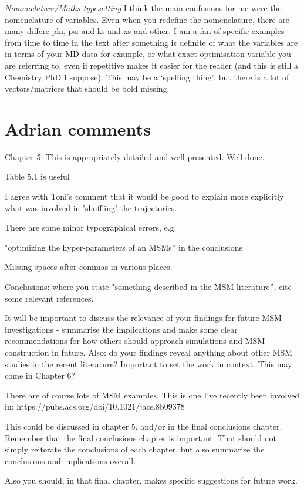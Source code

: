 \emph{Nomenclature/Maths typesetting}
I think the main confusions for me were the nomenclature of variables. Even when you redefine the nomenclature, there are many differe phi, psi and ks and xs and other. I am a fan of specific examples from time to time in the text after something is definite of what the variables are in terms of your MD data for example, or what exact optimisation variable you are referring to, even if repetitive makes it easier for the reader (and this is still a Chemistry PhD I suppose). This may be a ‘spelling thing’, but there is a lot of vectors/matrices that should be bold missing. 

\section{Adrian comments}

Chapter 5: 
This is appropriately detailed and well presented. Well done. 


Table 5.1 is useful

I agree with Toni’s comment that it would be good to explain more explicitly what was involved in ’shuffling’ the trajectories. 

There are some minor typographical errors, e.g. 

"optimizing the hyper-parameters of an MSMs” in the conclusions

Missing spaces after commas in various places. 

Conclusions: where you state "something described in the MSM literature”, cite some relevant references. 

It will be important to discuss the relevance of your findings for future MSM investigations - summarise the implications and make some clear recommendations for how others should approach simulations and MSM construction in future. Also: do your findings reveal anything about other MSM studies in the recent literature? Important to set the work in context. This may come in Chapter 6?

There are of course lots of MSM examples. This is one I’ve recently been involved in: 
https://pubs.acs.org/doi/10.1021/jacs.8b09378 

This could be discussed in chapter 5, and/or in the final conclusions chapter. 
Remember that the final conclusions chapter is important. That should not simply reiterate the conclusions of each chapter, but also summarise the conclusions and implications overall. 

Also you should, in that final chapter, makes specific suggestions for future work. 

